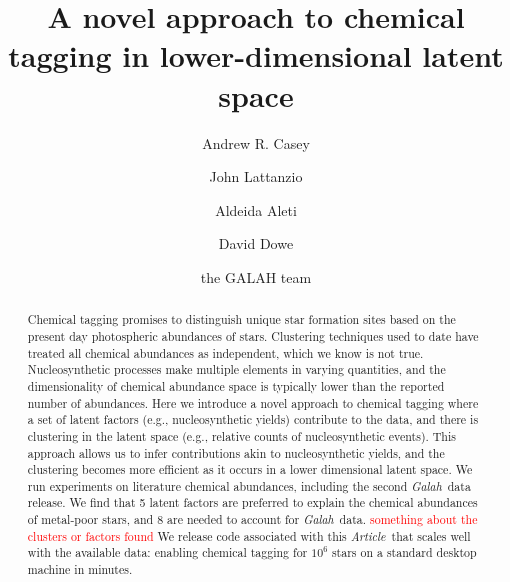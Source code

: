 \documentclass[twocolumn]{aastex61}
\newcommand{\project}[1]{\textsl{#1}}
\newcommand{\article}{\emph{Article}}
\newcommand{\Galah}{\project{Galah}}
\newcommand{\todo}[1]{\textcolor{red}{#1}}
\begin{document}
\title{A novel approach to chemical tagging in lower-dimensional latent space}


\author[0000-0003-0174-0564]{Andrew R. Casey}
			 
\author{John Lattanzio}

\author{Aldeida Aleti}

\author{David Dowe}

\author{the GALAH team}


\begin{abstract}
Chemical tagging promises to distinguish unique star formation sites based on the
present day photospheric abundances of stars. Clustering techniques used to date
have treated all chemical abundances as independent, which we know is not true.
Nucleosynthetic processes make multiple elements in varying quantities, and the
dimensionality of chemical abundance space is typically lower than the reported
number of abundances. Here we introduce a novel approach to chemical tagging 
where a set of latent factors (e.g., nucleosynthetic yields) contribute to the
data, and there is clustering in the latent space (e.g., relative counts of
nucleosynthetic events). This approach allows us to infer contributions akin to
nucleosynthetic yields, and the clustering becomes more efficient as it occurs in
a lower dimensional latent space.
We run experiments on literature chemical abundances,
including the second \Galah\ data release. We find that 5 latent factors are
preferred to explain the chemical abundances of metal-poor stars, and 8 are
needed to account for \Galah\ data.
\todo{something about the clusters or factors found}
We release code associated with this \article\ that scales well with the 
available data: enabling chemical tagging for $10^{6}$ stars on a standard
desktop machine in minutes.
\end{abstract}
\end{document}
